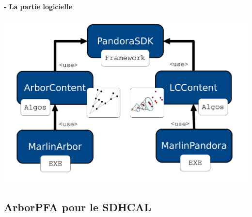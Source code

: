 \documentclass[8pt]{beamer}
\begin{document}
  \begin{frame}
  \frametitle{\secname}
  \framesubtitle{\subsecname - La partie logicielle}
    \begin{center}
      \includegraphics[width=\linewidth]{ArborSoftwareView.pdf}
    \end{center}
  \end{frame}

  \subsection{ArborPFA pour le SDHCAL}
\end{document}
